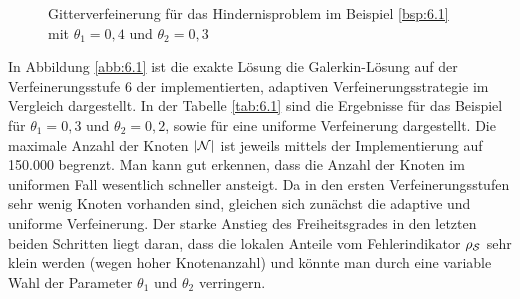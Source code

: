 \begin{bsp}
\begin{figure}[h]
\begin{center}
\hfill
{}
\end{center}
\caption{Gitterverfeinerung für das Hindernisproblem im Beispiel \ref{bsp:6.1} mit $\theta_1=0,4$ und $\theta_2=0,3$\label{abb:6.2}}
\end{figure}

In Abbildung \ref{abb:6.1} ist die exakte Lösung die Galerkin-Lösung auf der Verfeinerungsstufe 6 der implementierten, adaptiven Verfeinerungsstrategie im Vergleich dargestellt. In der Tabelle \ref{tab:6.1} sind die Ergebnisse für das Beispiel für $\theta_1 = 0,3$ und $\theta_2 = 0,2$, sowie für eine uniforme Verfeinerung dargestellt. Die maximale Anzahl der Knoten $\lvert \mathcal N\rvert$ ist jeweils mittels der Implementierung auf 150.000 begrenzt. Man kann gut erkennen, dass die Anzahl der Knoten im uniformen Fall wesentlich schneller ansteigt. Da in den ersten Verfeinerungsstufen sehr wenig Knoten vorhanden sind, gleichen sich zunächst die adaptive und uniforme Verfeinerung. Der starke Anstieg des Freiheitsgrades in den letzten beiden Schritten liegt daran, dass die lokalen Anteile vom Fehlerindikator $\rho_{\mathcal S}$ sehr klein werden (wegen hoher Knotenanzahl) und könnte man durch eine variable Wahl der Parameter $\theta_1$ und $\theta_2$ verringern. 


\end{bsp}

